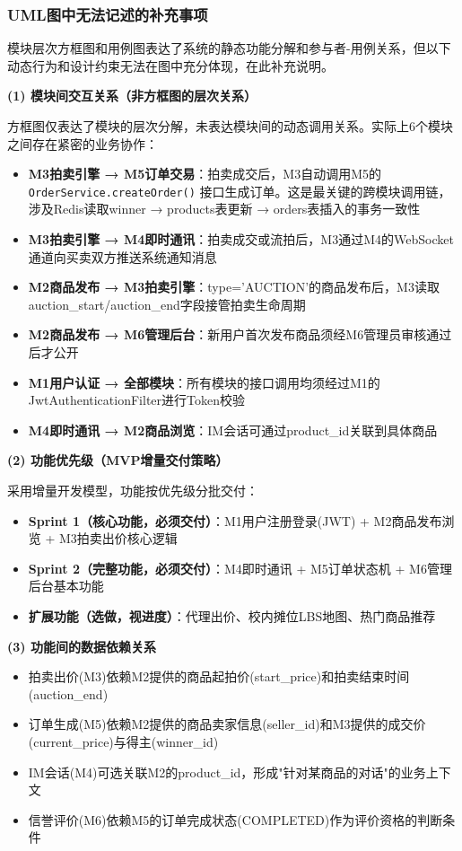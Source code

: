\documentclass[12pt,a4paper]{ctexart}
\numberwithin{figure}{section}
\numberwithin{table}{section}
\begin{document}
\subsubsection{UML图中无法记述的补充事项}

模块层次方框图和用例图表达了系统的静态功能分解和参与者-用例关系，但以下动态行为和设计约束无法在图中充分体现，在此补充说明。

\textbf{(1) 模块间交互关系（非方框图的层次关系）}

方框图仅表达了模块的层次分解，未表达模块间的动态调用关系。实际上6个模块之间存在紧密的业务协作：

\begin{itemize}
    \item \textbf{M3拍卖引擎 → M5订单交易}：拍卖成交后，M3自动调用M5的 \verb|OrderService.createOrder()| 接口生成订单。这是最关键的跨模块调用链，涉及Redis读取winner → products表更新 → orders表插入的事务一致性
    \item \textbf{M3拍卖引擎 → M4即时通讯}：拍卖成交或流拍后，M3通过M4的WebSocket通道向买卖双方推送系统通知消息
    \item \textbf{M2商品发布 → M3拍卖引擎}：type='AUCTION'的商品发布后，M3读取auction\_start/auction\_end字段接管拍卖生命周期
    \item \textbf{M2商品发布 → M6管理后台}：新用户首次发布商品须经M6管理员审核通过后才公开
    \item \textbf{M1用户认证 → 全部模块}：所有模块的接口调用均须经过M1的JwtAuthenticationFilter进行Token校验
    \item \textbf{M4即时通讯 → M2商品浏览}：IM会话可通过product\_id关联到具体商品
\end{itemize}

\textbf{(2) 功能优先级（MVP增量交付策略）}

采用增量开发模型，功能按优先级分批交付：

\begin{itemize}
    \item \textbf{Sprint 1（核心功能，必须交付）}：M1用户注册登录(JWT) + M2商品发布浏览 + M3拍卖出价核心逻辑
    \item \textbf{Sprint 2（完整功能，必须交付）}：M4即时通讯 + M5订单状态机 + M6管理后台基本功能
    \item \textbf{扩展功能（选做，视进度）}：代理出价、校内摊位LBS地图、热门商品推荐
\end{itemize}

\textbf{(3) 功能间的数据依赖关系}

\begin{itemize}
    \item 拍卖出价(M3)依赖M2提供的商品起拍价(start\_price)和拍卖结束时间(auction\_end)
    \item 订单生成(M5)依赖M2提供的商品卖家信息(seller\_id)和M3提供的成交价(current\_price)与得主(winner\_id)
    \item IM会话(M4)可选关联M2的product\_id，形成"针对某商品的对话"的业务上下文
    \item 信誉评价(M6)依赖M5的订单完成状态(COMPLETED)作为评价资格的判断条件
\end{itemize}
\end{document}
